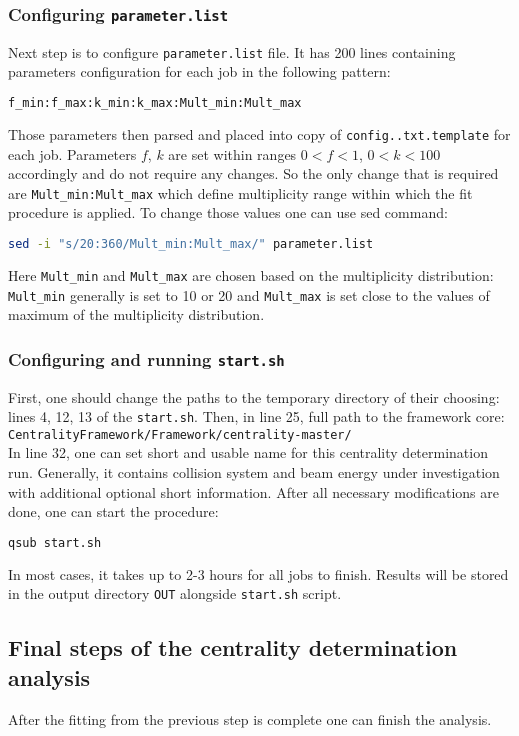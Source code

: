 \documentclass[11pt]{article}
\begin{document}
\subsubsection{Configuring \texttt{parameter.list}}
Next step is to configure \texttt{parameter.list} file. It has 200 lines containing parameters configuration for each job in the following pattern:
\begin{lstlisting}[language=bash,caption={}]
f_min:f_max:k_min:k_max:Mult_min:Mult_max
\end{lstlisting}
%
Those parameters then parsed and placed into copy of \texttt{config..txt.template} for each job. Parameters $f$, $k$ are set within ranges $0<f<1$, $0<k<100$ accordingly and do not require any changes. So the only change that is required are \texttt{Mult\_min:Mult\_max} which define multiplicity range within which the fit procedure is applied. To change those values one can use sed command:
\begin{lstlisting}[language=bash,caption={}]
sed -i "s/20:360/Mult_min:Mult_max/" parameter.list
\end{lstlisting}
%
Here \texttt{Mult\_min} and \texttt{Mult\_max} are chosen based on the multiplicity distribution: \texttt{Mult\_min} generally is set to 10 or 20 and \texttt{Mult\_max} is set close to the values of maximum of the multiplicity distribution.

\subsubsection{Configuring and running \texttt{start.sh}}
First, one should change the paths to the temporary directory of their choosing: lines 4, 12, 13 of the \texttt{start.sh}.
Then, in line 25, full path to the framework core: \\
\texttt{CentralityFramework/Framework/centrality-master/}\\
In line 32, one can set short and usable name for this centrality determination run. Generally, it contains collision system and beam energy under investigation with additional optional short information.
After all necessary modifications are done, one can start the procedure:
\begin{lstlisting}[language=bash,caption={}]
qsub start.sh
\end{lstlisting}
%
In most cases, it takes up to 2-3 hours for all jobs to finish.
Results will be stored in the output directory \texttt{OUT} alongside \texttt{start.sh} script.

\subsection{Final steps of the centrality determination analysis}
After the fitting from the previous step is complete one can finish the analysis.
\end{document}

